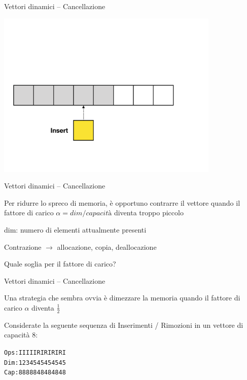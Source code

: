 \begin{frame}{Vettori dinamici -- Cancellazione}
\begin{overprint}
\centerline{\includegraphics[width=0.8\textwidth,page=8]{append-insert.pdf}}
\end{overprint}


\end{frame}

\begin{frame}{Vettori dinamici -- Cancellazione}

\vspace{-9pt}
\begin{myboxtitle}[Contrazione]
Per ridurre lo spreco di memoria, è opportuno contrarre il vettore quando il \alert{fattore di carico $\alpha = \textit{dim} / \textit{capacità}$} diventa troppo piccolo

\BI
\item \alert{dim}: numero di elementi attualmente presenti
\item Contrazione $\rightarrow$ allocazione, copia, deallocazione
\EI
\end{myboxtitle}

\begin{myboxtitle}[Domanda]
Quale soglia per il fattore di carico?
\end{myboxtitle}

\end{frame}

\begin{frame}[fragile]{Vettori dinamici -- Cancellazione}
	
\vspace{-9pt}
\begin{myboxtitle}
Una strategia che sembra ovvia è dimezzare la memoria quando il fattore di carico $\alpha$ diventa $\frac{1}{2}$
\end{myboxtitle}


\pause
\bigskip
Considerate la seguente sequenza di \alert{I}nserimenti / \alert{R}imozioni in un vettore di capacità $8$:
\begin{alltt}
Ops: I I I I I R I R I R I R I
Dim: 1 2 3 4 5 4 5 4 5 4 5 4 5
Cap: 8 8 8 8 8 4 8 4 8 4 8 4 8
\end{alltt}

\end{frame}

